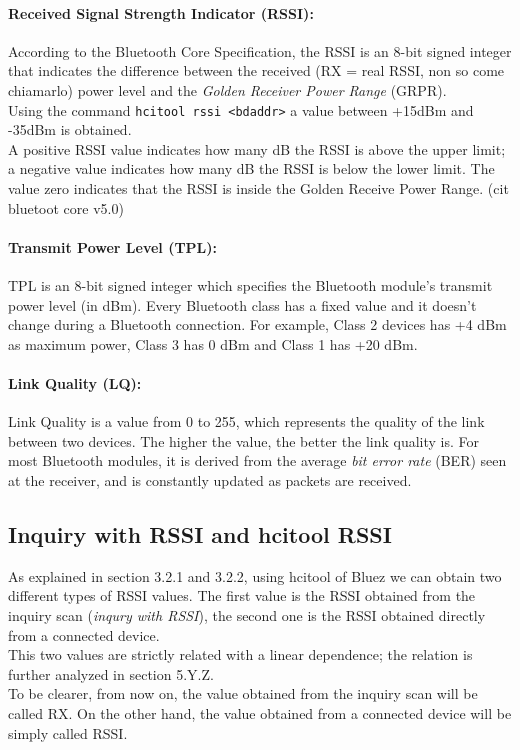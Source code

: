 \paragraph{Received Signal Strength Indicator (RSSI):}
According to the Bluetooth Core Specification, the RSSI is an 8-bit signed integer that indicates the difference between the received (RX = real RSSI, non so come chiamarlo) power level and the \textit{Golden Receiver Power Range} (GRPR). \\
Using the command \texttt{hcitool rssi \textless bdaddr\textgreater} a value between +15dBm and -35dBm is obtained. \\
A positive RSSI value indicates how many dB the RSSI is above the upper limit; a negative value indicates how many dB the RSSI is below the lower limit. The value zero indicates that the RSSI is inside the Golden Receive Power Range. (cit bluetoot core v5.0)

\paragraph{Transmit Power Level (TPL):}
TPL is an 8-bit signed integer which specifies the Bluetooth module's transmit power level (in dBm). Every Bluetooth class has a fixed value and it doesn't change during a Bluetooth connection. For example, Class 2 devices has +4 dBm as maximum power, Class 3 has 0 dBm and Class 1 has +20 dBm.

\paragraph{Link Quality (LQ):}
Link Quality is a value from 0 to 255, which represents the quality of the link between two devices. The higher the value, the better the link quality is. For most Bluetooth modules, it is derived from the average \textit{bit error rate} (BER) seen at the receiver, and is constantly updated as packets are received.

\subsection{Inquiry with RSSI and hcitool RSSI}
As explained in section 3.2.1 and 3.2.2, using hcitool of Bluez we can obtain two different types of RSSI values.
The first value is the RSSI obtained from the inquiry scan (\textit{inqury with RSSI}), the second one is the RSSI obtained directly from a connected device.\\
This two values are strictly related with a linear dependence; the relation is further analyzed in section 5.Y.Z. \\
To be clearer, from now on, the value obtained from the inquiry scan will be called RX. On the other hand, the value obtained from a connected device will be simply called RSSI.

